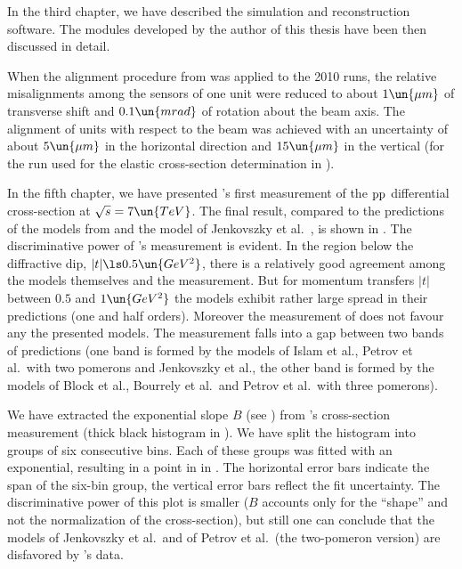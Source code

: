 In the third chapter, we have described the  simulation and reconstruction software. The modules developed by the author of this thesis have been then discussed in detail.

When the alignment procedure from  was applied to the 2010  runs, the relative misalignments among the sensors of one unit were reduced to about $1\un{\mu m}$ of transverse shift and $0.1\un{mrad}$ of rotation about the beam axis. The alignment of units with respect to the beam was achieved with an uncertainty of about $5\un{\mu m}$ in the horizontal direction and $15\un{\mu m}$ in the vertical (for the run used for the elastic cross-section determination in ).

In the fifth chapter, we have presented 's first measurement of the $\rm pp$ differential cross-section at $\sqrt s = 7\un{TeV}$. The final result, compared to the predictions of the models from  and the model of Jenkovszky et al.~, is shown in . The discriminative power of 's measurement is evident. In the region below the diffractive dip, $|t| \ls 0.5\un{GeV^2}$, there is a relatively good agreement among the models themselves and the measurement. But for momentum transfers $|t|$ between $0.5$ and $1\un{GeV^2}$ the models exhibit rather large spread in their predictions (one and half orders). Moreover the measurement of  does not favour any the presented models. The measurement falls into a gap between two bands of predictions (one band is formed by the models of Islam et al., Petrov et al.~with two pomerons and Jenkovszky et al., the other band is formed by the models of Block et al., Bourrely et al.~and Petrov et al.~with three pomerons).


We have extracted the exponential slope $B$ (see ) from 's cross-section measurement (thick black histogram in ). We have split the histogram into groups of six consecutive bins. Each of these groups was fitted with an exponential, resulting in a point in in . The horizontal error bars indicate the span of the six-bin group, the vertical error bars reflect the fit uncertainty. The discriminative power of this plot is smaller ($B$ accounts only for the ``shape'' and not the normalization of the cross-section), but still one can conclude that the models of Jenkovszky et al.~and of Petrov et al.~(the two-pomeron version) are disfavored by 's data.


